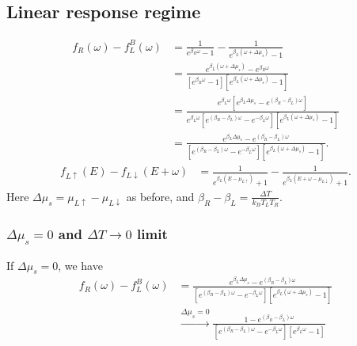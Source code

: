 \documentclass[aps,prb,superscriptaddress]{revtex4-2}
\begin{document}
\subsection{Linear response regime}
\begin{equation}\label{eq:fupdown0}
\begin{split}
f_{R}(\omega)-f_{L}^{B}(\omega) &= \frac{1}{e^{\beta_{R}\omega}-1} - \frac{1}{e^{\beta_{L}(\omega+\Delta\mu_{s})}-1} \\
&= \frac{e^{\beta_{L}(\omega+\Delta\mu_{s})} - e^{\beta_{R}\omega}}{[e^{\beta_{R}\omega}-1][e^{\beta_{L}(\omega+\Delta\mu_{s})}-1]} \\
&= \frac{e^{\beta_{L}\omega}[e^{\beta_{L}\Delta\mu_{s}} - e^{(\beta_{R}-\beta_{L})\omega}]}{e^{\beta_{L}\omega}[e^{(\beta_{R}-\beta_{L})\omega}-e^{-\beta_{L}\omega}][e^{\beta_{L}(\omega+\Delta\mu_{s})}-1]} \\
&= \frac{e^{\beta_{L}\Delta\mu_{s}} - e^{(\beta_{R}-\beta_{L})\omega}}{[e^{(\beta_{R}-\beta_{L})\omega}-e^{-\beta_{L}\omega}][e^{\beta_{L}(\omega+\Delta\mu_{s})}-1]}.
\end{split}
\end{equation}
\begin{equation}
\begin{split}
f_{L\uparrow}(E)-f_{L\downarrow}(E+\omega) &= \frac{1}{e^{\beta_{L}(E-\mu_{L\uparrow})}+1} - \frac{1}{e^{\beta_{L}(E+\omega-\mu_{L\downarrow})}+1}.
\end{split}
\end{equation}
Here $\Delta\mu_{s} = \mu_{L\uparrow} - \mu_{L\downarrow}$ as before, and $\beta_{R}-\beta_L = \frac{\Delta T}{k_{B}T_{L}T_{R}}$. 
\subsubsection{$\Delta\mu_s=0$ and $\Delta T\to 0$ limit}
If $\Delta\mu_{s} = 0$, we have
\begin{equation}
\begin{split}
f_{R}(\omega)-f_{L}^{B}(\omega) & =\frac{e^{\beta_{L}\Delta\mu_{s}} - e^{(\beta_{R}-\beta_{L})\omega}}{[e^{(\beta_{R}-\beta_{L})\omega}-e^{-\beta_{L}\omega}][e^{\beta_{L}(\omega+\Delta\mu_{s})}-1]} \\
&\stackrel{\Delta \mu_s= 0}{\rightarrow} \frac{1-e^{(\beta_{R}-\beta_{L})\omega}}{[e^{(\beta_{R}-\beta_{L})\omega}-e^{-\beta_{L}\omega}][e^{\beta_{L}\omega}-1]}
\end{split}
\end{equation}
\end{document}
